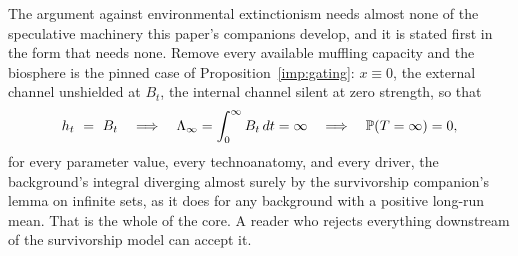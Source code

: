 The argument against environmental extinctionism needs almost none of
the speculative machinery this paper's companions develop, and it is
stated first in the form that needs none. Remove every available
muffling capacity and the biosphere is the pinned case of
Proposition~\ref{imp:gating}: $x\equiv0$, the external channel
unshielded at $B_t$, the internal channel silent at zero strength, so that
\[
h_t\ =\ B_t\quad\Longrightarrow\quad\Lambda_\infty=\int_0^\infty B_t\,dt=\infty
\quad\Longrightarrow\quad\PP(T=\infty)=0,
\]
for every parameter value, every technoanatomy, and every driver, the
background's integral diverging almost surely by the survivorship
companion's lemma on infinite sets, as it does for any background with a
positive long-run mean. That is the whole of
the core. A reader who rejects everything downstream of the survivorship
model can accept it.

